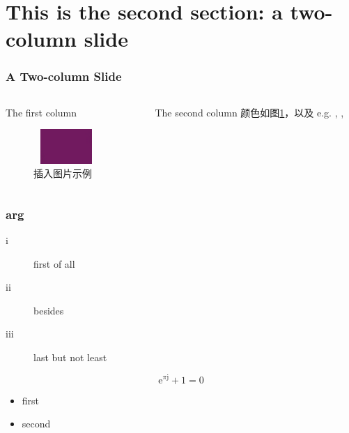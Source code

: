 \documentclass[UTF8]{beamer}
\begin{document}
\section{This is the second section: a two-column slide}
\begin{frame}
\frametitle{A Two-column Slide}
\begin{columns} 
\begin{column}{0.5\textwidth} 
\begin{block}{The first column}
\begin{figure}[htb]
	\includegraphics[width=2.5cm,height=1.3cm]{nkpurple.png}
	\caption{插入图片示例}
	\label{fig1}
    \end{figure}
\end{block}
\end{column}
\begin{column}{0.5\textwidth} 
\begin{block}{The second column}
颜色如图\ref{fig1}，以及 e.g. {\color{red}{red}}, {\color{orange}{orange}}, {\color{blue}{blue}}
\vspace{9.5em}
\end{block}
\end{column}
\end{columns}
\end{frame}

\begin{frame}
    \frametitle{arg}
    \begin{description}
        \item[i] first of all
        \item[ii] besides
        \item[iii] last but not least
    \end{description}
    \begin{equation}
        \text{e}^{\pi \text{j}} + 1 = 0
    \end{equation}
    \begin{itemize}
        \item first
        \item second
    \end{itemize}
\end{frame}
\end{document}
